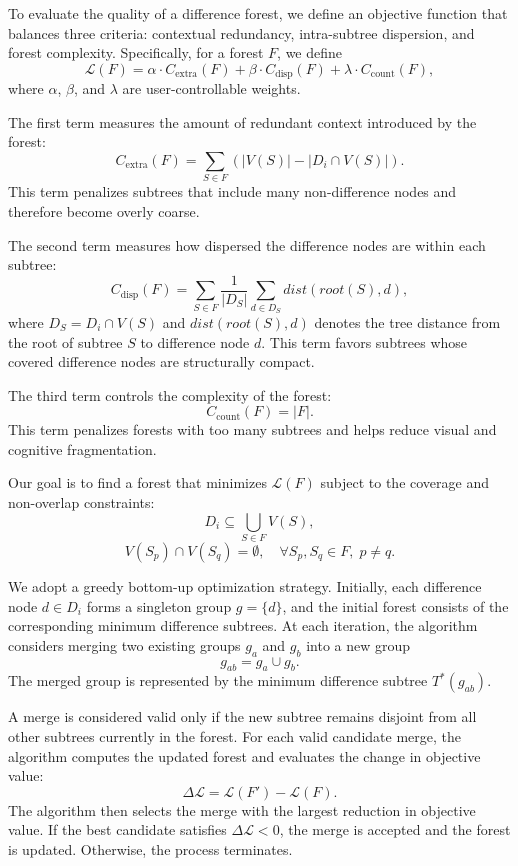 To evaluate the quality of a difference forest, we define an objective function that balances three criteria: contextual redundancy, intra-subtree dispersion, and forest complexity. Specifically, for a forest $F$, we define
\[
\mathcal{L}(F) = \alpha \cdot C_{\mathrm{extra}}(F) + \beta \cdot C_{\mathrm{disp}}(F) + \lambda \cdot C_{\mathrm{count}}(F),
\]
where $\alpha$, $\beta$, and $\lambda$ are user-controllable weights.

The first term measures the amount of redundant context introduced by the forest:
\[
C_{\mathrm{extra}}(F) = \sum_{S \in F} \left( |V(S)| - |D_i \cap V(S)| \right).
\]
This term penalizes subtrees that include many non-difference nodes and therefore become overly coarse.

The second term measures how dispersed the difference nodes are within each subtree:
\[
C_{\mathrm{disp}}(F) = \sum_{S \in F} \frac{1}{|D_S|} \sum_{d \in D_S} dist(root(S), d),
\]
where $D_S = D_i \cap V(S)$ and $dist(root(S), d)$ denotes the tree distance from the root of subtree $S$ to difference node $d$. This term favors subtrees whose covered difference nodes are structurally compact.

The third term controls the complexity of the forest:
\[
C_{\mathrm{count}}(F) = |F|.
\]
This term penalizes forests with too many subtrees and helps reduce visual and cognitive fragmentation.

Our goal is to find a forest that minimizes $\mathcal{L}(F)$ subject to the coverage and non-overlap constraints:
\[
D_i \subseteq \bigcup_{S \in F} V(S),
\]
\[
V(S_p) \cap V(S_q) = \emptyset, \quad \forall S_p, S_q \in F,\; p \neq q.
\]

We adopt a greedy bottom-up optimization strategy. Initially, each difference node $d \in D_i$ forms a singleton group $g = \{d\}$, and the initial forest consists of the corresponding minimum difference subtrees. At each iteration, the algorithm considers merging two existing groups $g_a$ and $g_b$ into a new group
\[
g_{ab} = g_a \cup g_b.
\]
The merged group is represented by the minimum difference subtree $T^*(g_{ab})$.

A merge is considered valid only if the new subtree remains disjoint from all other subtrees currently in the forest. For each valid candidate merge, the algorithm computes the updated forest and evaluates the change in objective value:
\[
\Delta \mathcal{L} = \mathcal{L}(F') - \mathcal{L}(F).
\]
The algorithm then selects the merge with the largest reduction in objective value. If the best candidate satisfies $\Delta \mathcal{L} < 0$, the merge is accepted and the forest is updated. Otherwise, the process terminates.

